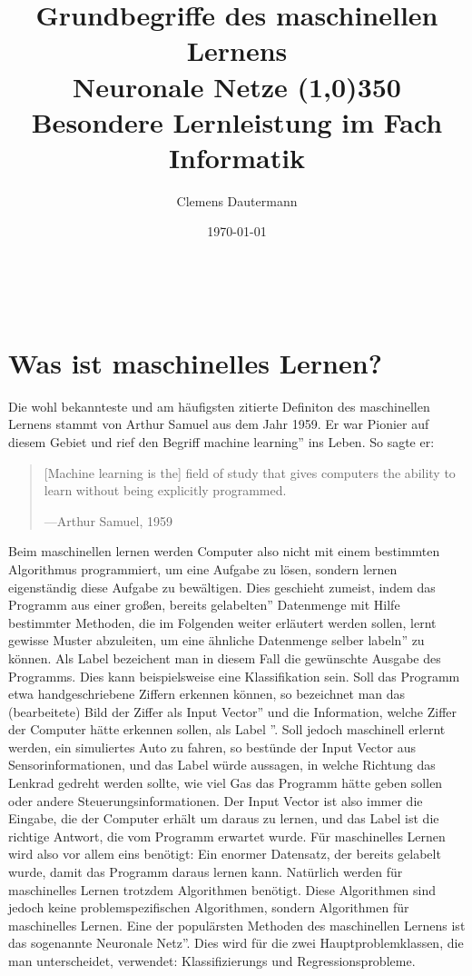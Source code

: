 \documentclass[11pt]{article}
\author{Clemens Dautermann}
\title{\Huge Grundbegriffe des maschinellen Lernens\\
	\bigskip
\huge Neuronale Netze \line(1,0){350}
\vspace*{10mm}
\Large Besondere Lernleistung im Fach Informatik
\vspace*{70mm}}
\date{\today{}}
\begin{document}
\biolinum
{}
\
\begin{titlepage}
	\maketitle
\end{titlepage}
\tableofcontents{}
\newpage

\section{Was ist maschinelles Lernen?}
Die wohl bekannteste und am häufigsten zitierte Definiton des maschinellen Lernens stammt von Arthur Samuel aus dem Jahr 1959. Er war Pionier auf diesem Gebiet und rief den Begriff \glqq machine learning'' ins Leben. So sagte er:
\begin{quote}
	[Machine learning is the] field of study that gives computers the ability to learn without being explicitly programmed\cite{1}.
	\begin{flushright}
		---Arthur Samuel, 1959
	\end{flushright}
\end{quote}
Beim maschinellen lernen werden Computer also nicht mit einem bestimmten Algorithmus programmiert, um eine Aufgabe zu lösen, sondern lernen eigenständig diese Aufgabe zu bewältigen. Dies geschieht zumeist, indem das Programm aus einer großen, bereits \glqq gelabelten'' Datenmenge mit Hilfe bestimmter Methoden, die im Folgenden weiter erläutert werden sollen, lernt gewisse Muster abzuleiten,  um eine ähnliche Datenmenge selber \glqq labeln'' zu können.  Als Label bezeichent man in diesem Fall die gewünschte Ausgabe des Programms. Dies kann beispielsweise eine Klassifikation sein. Soll das Programm etwa handgeschriebene Ziffern erkennen können, so bezeichnet man das (bearbeitete) Bild der Ziffer als \glqq Input Vector'' und die Information, welche Ziffer der Computer hätte erkennen sollen, als \glqq Label ''. Soll jedoch maschinell erlernt werden, ein simuliertes Auto zu fahren, so bestünde der Input Vector aus Sensorinformationen, und das Label würde aussagen, in welche Richtung das Lenkrad gedreht werden sollte, wie viel Gas das Programm hätte geben sollen oder andere Steuerungsinformationen. Der Input Vector ist also immer die Eingabe, die der Computer erhält um daraus zu lernen, und das Label ist die richtige Antwort, die vom Programm erwartet wurde. Für maschinelles Lernen wird also vor allem eins benötigt: Ein enormer Datensatz, der bereits gelabelt wurde, damit das Programm daraus lernen kann.\newline
Natürlich werden für maschinelles Lernen trotzdem Algorithmen benötigt. Diese Algorithmen sind jedoch keine problemspezifischen Algorithmen, sondern Algorithmen für maschinelles Lernen. Eine der populärsten Methoden des maschinellen Lernens ist das sogenannte \glqq Neuronale Netz''. Dies wird für die zwei Hauptproblemklassen, die man unterscheidet, verwendet: Klassifizierungs und Regressionsprobleme. 
\end{document}
